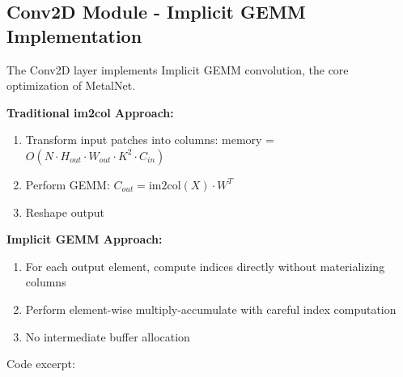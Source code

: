 \documentclass[12pt,oneside,a4paper]{report}
\begin{document}
\subsection{Conv2D Module - Implicit GEMM Implementation}

The Conv2D layer implements Implicit GEMM convolution, the core optimization of MetalNet.

\textbf{Traditional im2col Approach:}
\begin{enumerate}
    \item Transform input patches into columns: memory = $O(N \cdot H_{out} \cdot W_{out} \cdot K^2 \cdot C_{in})$
    \item Perform GEMM: $C_{out} = \text{im2col}(X) \cdot W^T$
    \item Reshape output
\end{enumerate}

\textbf{Implicit GEMM Approach:}
\begin{enumerate}
    \item For each output element, compute indices directly without materializing columns
    \item Perform element-wise multiply-accumulate with careful index computation
    \item No intermediate buffer allocation
\end{enumerate}

Code excerpt:
\end{document}
